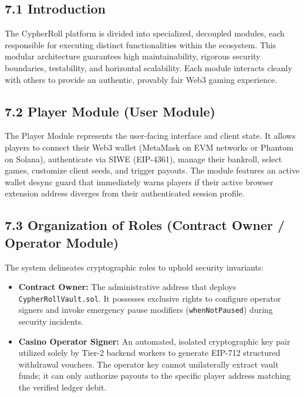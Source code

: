 \vspace{1.0cm}
\par
\label{chap:modules}
\vspace{0.15cm}
\par
\vspace{0.3cm}

\subsection*{7.1 Introduction}
The CypherRoll platform is divided into specialized, decoupled modules, each responsible for executing distinct functionalities within the ecosystem. This modular architecture guarantees high maintainability, rigorous security boundaries, testability, and horizontal scalability. Each module interacts cleanly with others to provide an authentic, provably fair Web3 gaming experience.

\subsection*{7.2 Player Module (User Module)}
The Player Module represents the user-facing interface and client state. It allows players to connect their Web3 wallet (MetaMask on EVM networks or Phantom on Solana), authenticate via SIWE (EIP-4361), manage their bankroll, select games, customize client seeds, and trigger payouts. The module features an active wallet desync guard that immediately warns players if their active browser extension address diverges from their authenticated session profile.

\subsection*{7.3 Organization of Roles (Contract Owner / Operator Module)}
The system delineates cryptographic roles to uphold security invariants:
\begin{itemize}[leftmargin=1.5em]
    \item \textbf{Contract Owner:} The administrative address that deploys \texttt{CypherRollVault.sol}. It possesses exclusive rights to configure operator signers and invoke emergency pause modifiers (\texttt{whenNotPaused}) during security incidents.
    \item \textbf{Casino Operator Signer:} An automated, isolated cryptographic key pair utilized solely by Tier-2 backend workers to generate EIP-712 structured withdrawal vouchers. The operator key cannot unilaterally extract vault funds; it can only authorize payouts to the specific player address matching the verified ledger debit.
\end{itemize}

